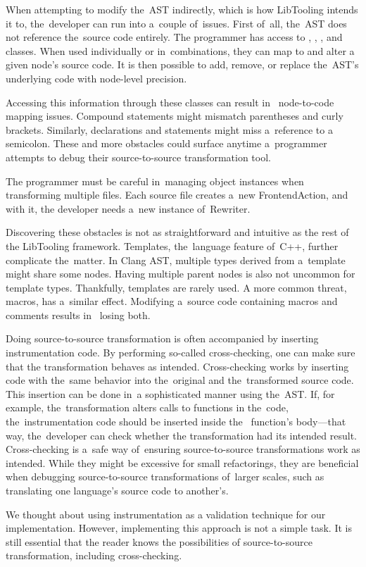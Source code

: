 When attempting to modify the~AST indirectly, which is how LibTooling 
intends it to, the~developer can run into a~couple of~issues. 
First of~all, the~AST does not reference the~source code entirely. 
The programmer has access to , ,
, and  classes. 
When used individually or in~combinations, they can map to and alter 
a given node's source code.
It is then possible to add, remove, or replace the~AST's underlying 
code with node-level precision.

Accessing this information through these classes can result in~
node-to-code mapping issues. 
Compound statements might mismatch parentheses and curly brackets. 
Similarly, declarations and statements might miss a~reference to 
a semicolon. 
These and more obstacles could surface anytime a~programmer attempts 
to debug their source-to-source transformation tool. 

The programmer must be careful in~managing object instances when 
transforming multiple files. 
Each source file creates a~new FrontendAction, and with it, 
the developer needs a~new instance of~Rewriter.

Discovering these obstacles is not as straightforward and intuitive as 
the rest of the LibTooling framework.
Templates, the~language feature of~C++, further complicate the~matter. 
In Clang AST, multiple types derived from a~template might share some nodes. 
Having multiple parent nodes is also not uncommon for template types. 
Thankfully, templates are rarely used. 
A more common threat, macros, has a~similar effect. 
Modifying a~source code containing macros and comments results in~
losing both.

Doing source-to-source transformation is often accompanied by 
inserting instrumentation code. 
By performing so-called cross-checking, one can make sure that 
the transformation behaves as intended. 
Cross-checking works by inserting code with the~same behavior 
into the~original and the~transformed source code.  
This insertion can be done in~a sophisticated manner using the~AST. 
If, for example, the~transformation alters calls to functions 
in the~code, the~instrumentation code should be inserted inside the~
function's body—that way, the~developer can check whether 
the transformation had its intended result.
Cross-checking is a~safe way of~ensuring source-to-source 
transformations work as intended. 
While they might be excessive for small refactorings, 
they are beneficial when debugging source-to-source 
transformations of~larger scales, such as translating 
one language's source code to another's.

We thought about using instrumentation as a validation technique for our 
implementation. 
However, implementing this approach is not a simple task. 
It is still essential that the reader knows the possibilities of 
source-to-source transformation, including cross-checking.